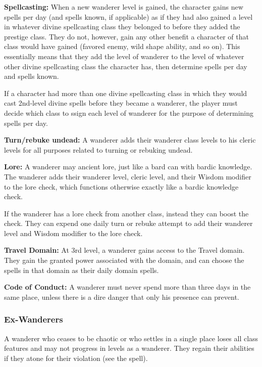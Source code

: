 {
\textbf{Spellcasting:} When a new wanderer level is gained, the character gains new spells per day (and spells known, if applicable) as if they had also gained a level in whatever divine spellcasting class they belonged to before they added the prestige class. They do not, however, gain any other benefit a character of that class would have gained (favored enemy, wild shape ability, and so on). This essentially means that they add the level of wanderer to the level of whatever other divine spellcasting class the character has, then determine spells per day and spells known.

If a character had more than one divine spellcasting class in which they would cast 2nd-level divine spells before they became a wanderer, the player must decide which class to ssign each level of wanderer for the purpose of determining spells per day.

\textbf{Turn/rebuke undead:} A wanderer adds their wanderer class levels to his cleric levels for all purposes related to turning or rebuking undead.

\textbf{Lore:} A wanderer may ancient lore, just like a bard can with bardic knowledge. The wanderer adds their wanderer level, cleric level, and their Wisdom modifier to the lore check, which functions otherwise exactly like a bardic knowledge check.

If the wanderer has a lore check from another class, instead they can boost the check. They can expend one daily turn or rebuke attempt to add their wanderer level and Wisdom modifier to the lore check.

\textbf{Travel Domain:} At 3rd level, a wanderer gains access to the Travel domain. They gain the granted power associated with the domain, and can choose the spells in that domain as their daily domain spells.

\textbf{Code of Conduct:} A wanderer must never spend more than three days in the same place, unless there is a dire danger that only his presence can prevent.

\subsubsection{Ex-Wanderers}
A wanderer who ceases to be chaotic or who settles in a single place loses all class features and may not progress in levels as a wanderer. They regain their abilities if they atone for their violation (see the  spell).
}

